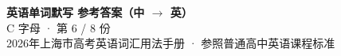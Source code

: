 \documentclass[10pt,a4paper]{article}
\begin{document}
\pagestyle{plain}

\begin{center}
{\LARGE\bfseries 英语单词默写 \quad 参考答案（中 $\to$ 英）}\\[0.22em]
{\large C 字母 · 第 6 / 8 份}\\[0.18em]
{\small 2026年上海市高考英语词汇用法手册 · 参照普通高中英语课程标准}
\end{center}

\vspace{0.2em}
\noindent{\color{rulegray}\rule{\textwidth}{0.8pt}}

\vspace{0.35em}

\vspace{0.25em}
\renewcommand{\arraystretch}{1.32}
\end{document}
